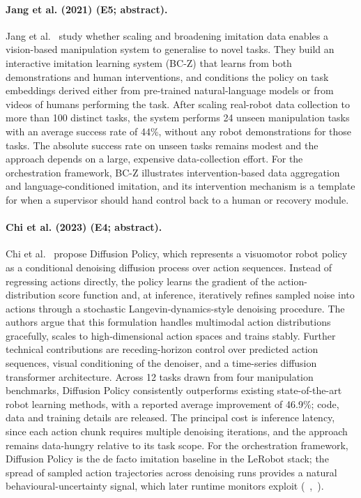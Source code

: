 \documentclass[10pt,a4paper]{article}
\begin{document}
\paragraph{Jang et al. (2021) (E5; abstract).} Jang et al.~\cite{Jang2021} study whether scaling and broadening imitation data enables a vision-based manipulation system to generalise to novel tasks. They build an interactive imitation learning system (BC-Z) that learns from both demonstrations and human interventions, and conditions the policy on task embeddings derived either from pre-trained natural-language models or from videos of humans performing the task. After scaling real-robot data collection to more than 100 distinct tasks, the system performs 24 unseen manipulation tasks with an average success rate of 44\%, without any robot demonstrations for those tasks. The absolute success rate on unseen tasks remains modest and the approach depends on a large, expensive data-collection effort. For the orchestration framework, BC-Z illustrates intervention-based data aggregation and language-conditioned imitation, and its intervention mechanism is a template for when a supervisor should hand control back to a human or recovery module.

\paragraph{Chi et al. (2023) (E4; abstract).} Chi et al.~\cite{Chi2023} propose Diffusion Policy, which represents a visuomotor robot policy as a conditional denoising diffusion process over action sequences. Instead of regressing actions directly, the policy learns the gradient of the action-distribution score function and, at inference, iteratively refines sampled noise into actions through a stochastic Langevin-dynamics-style denoising procedure. The authors argue that this formulation handles multimodal action distributions gracefully, scales to high-dimensional action spaces and trains stably. Further technical contributions are receding-horizon control over predicted action sequences, visual conditioning of the denoiser, and a time-series diffusion transformer architecture. Across 12 tasks drawn from four manipulation benchmarks, Diffusion Policy consistently outperforms existing state-of-the-art robot learning methods, with a reported average improvement of 46.9\%; code, data and training details are released. The principal cost is inference latency, since each action chunk requires multiple denoising iterations, and the approach remains data-hungry relative to its task scope. For the orchestration framework, Diffusion Policy is the de facto imitation baseline in the LeRobot stack; the spread of sampled action trajectories across denoising runs provides a natural behavioural-uncertainty signal, which later runtime monitors exploit (~\cite{Agia2024},~\cite{Xu2025}).
\end{document}
